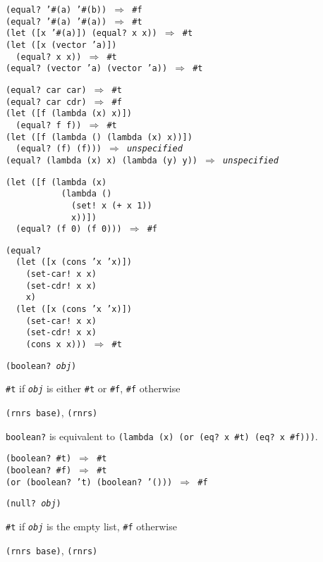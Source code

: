 \begin{alltt}
(equal? '\#{}(a) '\#{}(b)) \(\Rightarrow\) \#{}f
(equal? '\#{}(a) '\#{}(a)) \(\Rightarrow\) \#{}t
(let ([x '\#{}(a)]) (equal? x x)) \(\Rightarrow\) \#{}t
(let ([x (vector 'a)])
  (equal? x x)) \(\Rightarrow\) \#{}t
(equal? (vector 'a) (vector 'a)) \(\Rightarrow\) \#{}t

(equal? car car) \(\Rightarrow\) \#{}t
(equal? car cdr) \(\Rightarrow\) \#{}f
(let ([f (lambda (x) x)])
  (equal? f f)) \(\Rightarrow\) \#{}t
(let ([f (lambda () (lambda (x) x))])
  (equal? (f) (f))) \(\Rightarrow\) \textit{unspecified}
(equal? (lambda (x) x) (lambda (y) y)) \(\Rightarrow\) \textit{unspecified}

(let ([f (lambda (x)
           (lambda ()
             (set! x (+ x 1))
             x))])
  (equal? (f 0) (f 0))) \(\Rightarrow\) \#{}f

(equal?
  (let ([x (cons 'x 'x)])
    (set-car! x x)
    (set-cdr! x x)
    x)
  (let ([x (cons 'x 'x)])
    (set-car! x x)
    (set-cdr! x x)
    (cons x x))) \(\Rightarrow\) \#{}t
\end{alltt}

\begin{description}

\label{objects_s14}\item[procedure] \texttt{(boolean? \textit{obj})}



\item[returns] \texttt{\#{}t} if \texttt{\textit{obj}} is either \texttt{\#{}t} or \texttt{\#{}f}, \texttt{\#{}f} otherwise


\item[libraries] \texttt{(rnrs base)}, \texttt{(rnrs)}
\end{description}

\texttt{boolean?} is equivalent to
\texttt{(lambda (x) (or (eq? x \#{}t) (eq? x \#{}f)))}.

\begin{alltt}
(boolean? \#{}t) \(\Rightarrow\) \#{}t
(boolean? \#{}f) \(\Rightarrow\) \#{}t
(or (boolean? 't) (boolean? '())) \(\Rightarrow\) \#{}f
\end{alltt}

\begin{description}

\label{objects_s15}\item[procedure] \texttt{(null? \textit{obj})}



\item[returns] \texttt{\#{}t} if \texttt{\textit{obj}} is the empty list, \texttt{\#{}f} otherwise


\item[libraries] \texttt{(rnrs base)}, \texttt{(rnrs)}
\end{description}


